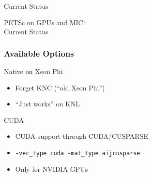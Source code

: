 

\begin{frame}{Current Status}
  \begin{center}
    \Large PETSc on GPUs and MIC: \\[1em] Current Status
  \end{center}
\end{frame}

\begin{frame}[fragile]
\frametitle{Available Options}

 \begin{minipage}{0.75\textwidth}
  \begin{block}{Native on Xeon Phi}
  \begin{itemize}
   \item Forget KNC (``old Xeon Phi'')
   \item ``Just works'' on KNL
  \end{itemize}
  \end{block}

  \begin{block}{CUDA}
  \begin{itemize}
   \item CUDA-support through CUDA/CUSPARSE
   \item \lstinline|-vec_type cuda -mat_type aijcusparse|
   \item Only for NVIDIA GPUs
  \end{itemize}
  \end{block}


\end{minipage}
\end{frame}
